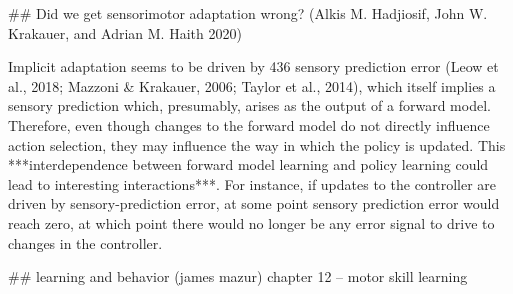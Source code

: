 \documentclass[../main.tex]{subfiles}
\begin{document}
{{## Did we get sensorimotor adaptation wrong? (Alkis M. Hadjiosif, John W. Krakauer, and Adrian M. Haith 2020)

Implicit adaptation seems to be driven by 436 sensory prediction error (Leow et al., 2018; Mazzoni & Krakauer, 2006; Taylor et al., 2014), which itself implies a sensory prediction which, presumably, arises as the output of a forward model. Therefore, even though changes to the forward model do not directly influence action selection, they may influence the way  in  which  the  policy  is  updated.  This  ***interdependence  between forward model learning and policy learning could lead to interesting  interactions***.  For  instance,  if  updates  to  the  controller  are  driven  by  sensory-prediction error, at some point sensory prediction error would reach zero, at which point there would no longer be any error signal to drive to changes in the controller.


## learning and behavior (james mazur) chapter 12 -- motor skill learning

}}
\end{document}
